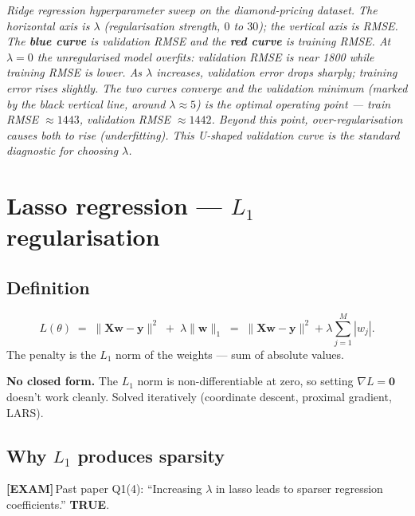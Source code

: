 \documentclass[11pt, a4paper]{article}
\newcommand{\examflag}{\textcolor{tipBd}{\textbf{[EXAM]}}\,}
\begin{document}
\begin{center}

\footnotesize\textit{Ridge regression hyperparameter sweep on the diamond-pricing dataset. The horizontal axis is $\lambda$ (regularisation strength, $0$ to $30$); the vertical axis is RMSE. The \textbf{blue curve} is validation RMSE and the \textbf{red curve} is training RMSE. At $\lambda = 0$ the unregularised model overfits: validation RMSE is near 1800 while training RMSE is lower. As $\lambda$ increases, validation error drops sharply; training error rises slightly. The two curves converge and the validation minimum (marked by the black vertical line, around $\lambda \approx 5$) is the optimal operating point --- train RMSE $\approx 1443$, validation RMSE $\approx 1442$. Beyond this point, over-regularisation causes both to rise (underfitting). This U-shaped validation curve is the standard diagnostic for choosing $\lambda$.}
\end{center}

\section{Lasso regression --- $L_1$ regularisation}

\subsection{Definition}

\begin{defbox}
\[
L(\theta) \;=\; \|\mathbf{X}\mathbf{w} - \mathbf{y}\|^2 \;+\; \lambda\|\mathbf{w}\|_1 \;=\; \|\mathbf{X}\mathbf{w} - \mathbf{y}\|^2 + \lambda\sum_{j=1}^M |w_j|.
\]
The penalty is the $L_1$ norm of the weights — sum of absolute values.
\end{defbox}

\textbf{No closed form.} The $L_1$ norm is non-differentiable at zero, so setting $\nabla L = \mathbf{0}$ doesn't work cleanly. Solved iteratively (coordinate descent, proximal gradient, LARS).

\subsection{Why $L_1$ produces sparsity}

\examflag{}Past paper Q1(4): ``Increasing $\lambda$ in lasso leads to sparser regression coefficients.'' \textbf{TRUE}.
\end{document}
